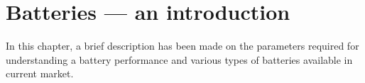 
\chapter{Batteries --- an introduction} %
In this chapter, a brief description has been made on the parameters required for understanding a battery performance and various types of batteries available in current market.   
\label{chap1} %


\newcommand{\keyword}[1]{\textbf{#1}}
\newcommand{\tabhead}[1]{\textbf{#1}}
\newcommand{\code}[1]{\texttt{#1}}
\newcommand{\file}[1]{\texttt{\bfseries#1}}
\newcommand{\option}[1]{\texttt{\itshape#1}}

